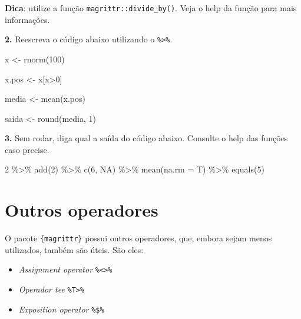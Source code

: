 \documentclass[
]{book}
\newenvironment{Shaded}{\begin{snugshade}}{\end{snugshade}}
\newcommand{\AttributeTok}[1]{\textcolor[rgb]{0.77,0.63,0.00}{#1}}
\newcommand{\ConstantTok}[1]{\textcolor[rgb]{0.00,0.00,0.00}{#1}}
\newcommand{\DecValTok}[1]{\textcolor[rgb]{0.00,0.00,0.81}{#1}}
\newcommand{\FunctionTok}[1]{\textcolor[rgb]{0.00,0.00,0.00}{#1}}
\newcommand{\NormalTok}[1]{#1}
\newcommand{\OtherTok}[1]{\textcolor[rgb]{0.56,0.35,0.01}{#1}}
\newcommand{\SpecialCharTok}[1]{\textcolor[rgb]{0.00,0.00,0.00}{#1}}
\begin{document}
\textbf{Dica}: utilize a função \texttt{magrittr::divide\_by()}. Veja o help da função para mais informações.

\textbf{2.} Reescreva o código abaixo utilizando o \texttt{\%\textgreater{}\%}.

\begin{Shaded}
\begin{Highlighting}[]

\NormalTok{x }\OtherTok{\textless{}{-}} \FunctionTok{rnorm}\NormalTok{(}\DecValTok{100}\NormalTok{)}

\NormalTok{x.pos }\OtherTok{\textless{}{-}}\NormalTok{ x[x}\SpecialCharTok{\textgreater{}}\DecValTok{0}\NormalTok{]}

\NormalTok{media }\OtherTok{\textless{}{-}} \FunctionTok{mean}\NormalTok{(x.pos)}

\NormalTok{saida }\OtherTok{\textless{}{-}} \FunctionTok{round}\NormalTok{(media, }\DecValTok{1}\NormalTok{)}
\end{Highlighting}
\end{Shaded}

\textbf{3.} Sem rodar, diga qual a saída do código abaixo. Consulte o help das funções caso precise.

\begin{Shaded}
\begin{Highlighting}[]
\DecValTok{2} \SpecialCharTok{\%\textgreater{}\%}
  \FunctionTok{add}\NormalTok{(}\DecValTok{2}\NormalTok{) }\SpecialCharTok{\%\textgreater{}\%}
  \FunctionTok{c}\NormalTok{(}\DecValTok{6}\NormalTok{, }\ConstantTok{NA}\NormalTok{) }\SpecialCharTok{\%\textgreater{}\%}
  \FunctionTok{mean}\NormalTok{(}\AttributeTok{na.rm =}\NormalTok{ T) }\SpecialCharTok{\%\textgreater{}\%}
  \FunctionTok{equals}\NormalTok{(}\DecValTok{5}\NormalTok{)}
\end{Highlighting}
\end{Shaded}

\hypertarget{outros-operadores}{%
\section{Outros operadores}\label{outros-operadores}}

O pacote \texttt{\{magrittr\}} possui outros operadores, que, embora sejam menos utilizados, também são úteis. São eles:

\begin{itemize}
\item
  \emph{Assignment operator} \texttt{\%\textless{}\textgreater{}\%}
\item
  \emph{Operador tee} \texttt{\%T\textgreater{}\%}
\item
  \emph{Exposition operator} \texttt{\%\$\%}
\end{itemize}
\end{document}
